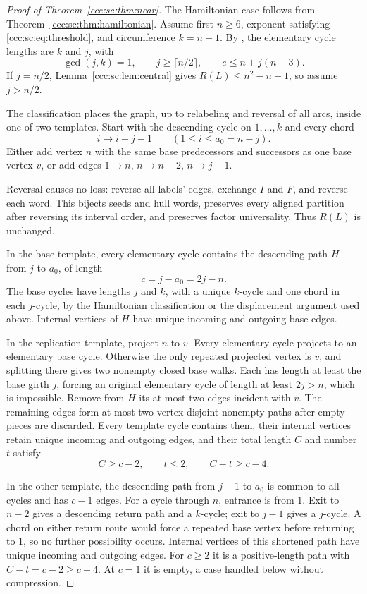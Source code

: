 \documentclass[11pt,letterpaper]{article}
\theoremstyle{definition}
\theoremstyle{remark}
\begin{document}
\begin{proof}[Proof of Theorem~\ref{ccc:sc:thm:near}]
The Hamiltonian case follows from Theorem~\ref{ccc:sc:thm:hamiltonian}. Assume first $n\ge6$, exponent satisfying \eqref{ccc:sc:eq:threshold}, and circumference $k=n-1$. By \cite[Theorems~1.1--1.2]{KOV}, the elementary cycle lengths are $k$ and $j$, with
\begin{equation}\label{ccc:sc:eq:near-exp}
 \gcd(j,k)=1,\qquad j\ge\lceil n/2\rceil,\qquad e\le n+j(n-3).
\end{equation}
If $j=n/2$, Lemma~\ref{ccc:sc:lem:central} gives $R(L)\le n^2-n+1$, so assume $j>n/2$.

The classification \cite[Theorem~3.3]{KOV} places the graph, up to relabeling and reversal of all arcs, inside one of two templates. Start with the descending cycle on $1,\ldots,k$ and every chord
\[
 i\to i+j-1\qquad(1\le i\le a_0=n-j).
\]
Either add vertex $n$ with the same base predecessors and successors as one base vertex $v$, or add edges $1\to n$, $n\to n-2$, $n\to j-1$.

Reversal causes no loss: reverse all labels' edges, exchange $I$ and $F$, and reverse each word. This bijects seeds and hull words, preserves every aligned partition after reversing its interval order, and preserves factor universality. Thus $R(L)$ is unchanged.

In the base template, every elementary cycle contains the descending path $H$ from $j$ to $a_0$, of length
\[
 c=j-a_0=2j-n.
\]
The base cycles have lengths $j$ and $k$, with a unique $k$-cycle and one chord in each $j$-cycle, by the Hamiltonian classification or the displacement argument used above. Internal vertices of $H$ have unique incoming and outgoing base edges.

In the replication template, project $n$ to $v$. Every elementary cycle projects to an elementary base cycle. Otherwise the only repeated projected vertex is $v$, and splitting there gives two nonempty closed base walks. Each has length at least the base girth $j$, forcing an original elementary cycle of length at least $2j>n$, which is impossible. Remove from $H$ its at most two edges incident with $v$. The remaining edges form at most two vertex-disjoint nonempty paths after empty pieces are discarded. Every template cycle contains them, their internal vertices retain unique incoming and outgoing edges, and their total length $C$ and number $t$ satisfy
\[
 C\ge c-2,\qquad t\le2,\qquad C-t\ge c-4.
\]

In the other template, the descending path from $j-1$ to $a_0$ is common to all cycles and has $c-1$ edges. For a cycle through $n$, entrance is from $1$. Exit to $n-2$ gives a descending return path and a $k$-cycle; exit to $j-1$ gives a $j$-cycle. A chord on either return route would force a repeated base vertex before returning to $1$, so no further possibility occurs. Internal vertices of this shortened path have unique incoming and outgoing edges. For $c\ge2$ it is a positive-length path with $C-t=c-2\ge c-4$. At $c=1$ it is empty, a case handled below without compression.


\end{proof}
\end{document}
